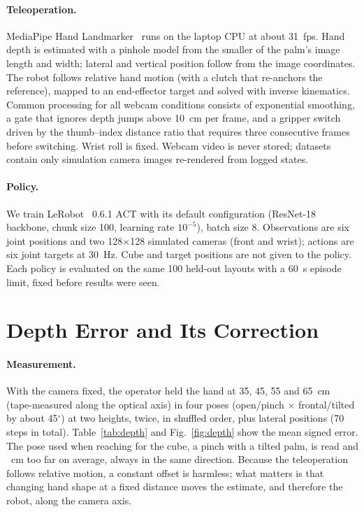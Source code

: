 \documentclass[10pt]{article}
\begin{document}
\paragraph{Teleoperation.}
MediaPipe Hand Landmarker~\citep{zhang2020mediapipehands} runs on the laptop CPU at about 31~fps.
Hand depth is estimated with a pinhole model from the smaller of the palm's image length and width; lateral and vertical position follow from the image coordinates.
The robot follows relative hand motion (with a clutch that re-anchors the reference), mapped to an end-effector target and solved with inverse kinematics.
Common processing for all webcam conditions consists of exponential smoothing, a gate that ignores depth jumps above 10~cm per frame, and a gripper switch driven by the thumb--index distance ratio that requires three consecutive frames before switching.
Wrist roll is fixed.
Webcam video is never stored; datasets contain only simulation camera images re-rendered from logged states.

\paragraph{Policy.}
We train LeRobot~\citep{cadene2024lerobot} 0.6.1 ACT with its default configuration (ResNet-18 backbone, chunk size 100, learning rate $10^{-5}$), batch size 8.
Observations are six joint positions and two 128$\times$128 simulated cameras (front and wrist); actions are six joint targets at 30~Hz.
Cube and target positions are not given to the policy.
Each policy is evaluated on the same 100 held-out layouts with a 60~s episode limit, fixed before results were seen.

\section{Depth Error and Its Correction}

\paragraph{Measurement.}
With the camera fixed, the operator held the hand at 35, 45, 55 and 65~cm (tape-measured along the optical axis) in four poses (open/pinch $\times$ frontal/tilted by about 45$^\circ$) at two heights, twice, in shuffled order, plus lateral positions (70 steps in total).
Table~\ref{tab:depth} and Fig.~\ref{fig:depth} show the mean signed error.
The pose used when reaching for the cube, a pinch with a tilted palm, is read \depthPinchtiltCam{} and \depthPinchtiltLow{}~cm too far on average, always in the same direction.
Because the teleoperation follows relative motion, a constant offset is harmless; what matters is that changing hand shape at a fixed distance moves the estimate, and therefore the robot, along the camera axis.
\end{document}
